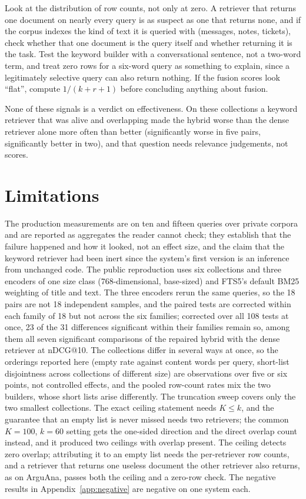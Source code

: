 \documentclass[11pt]{article}
\begin{document}
Look at the distribution of row counts, not only at zero. A retriever that returns one document on nearly every query is as suspect as one that returns none, and if the corpus indexes the kind of text it is queried with (messages, notes, tickets), check whether that one document is the query itself and whether returning it is the task. Test the keyword builder with a conversational sentence, not a two-word term, and treat zero rows for a six-word query as something to explain, since a legitimately selective query can also return nothing. If the fusion scores look ``flat'', compute $1/(k+r+1)$ before concluding anything about fusion.

None of these signals is a verdict on effectiveness. On these collections a keyword retriever that was alive and overlapping made the hybrid worse than the dense retriever alone more often than better (significantly worse in five pairs, significantly better in two), and that question needs relevance judgements, not scores.

\section{Limitations}
\label{sec:limits}

The production measurements are on ten and fifteen queries over private corpora and are reported as aggregates the reader cannot check; they establish that the failure happened and how it looked, not an effect size, and the claim that the keyword retriever had been inert since the system's first version is an inference from unchanged code. The public reproduction uses six collections and three encoders of one size class (768-dimensional, base-sized) and FTS5's default BM25 weighting of title and text. The three encoders rerun the same queries, so the 18 pairs are not 18 independent samples, and the paired tests are corrected within each family of 18 but not across the six families; corrected over all 108 tests at once, 23 of the 31 differences significant within their families remain so, among them all seven significant comparisons of the repaired hybrid with the dense retriever at nDCG@10. The collections differ in several ways at once, so the orderings reported here (empty rate against content words per query, short-list disjointness across collections of different size) are observations over five or six points, not controlled effects, and the pooled row-count rates mix the two builders, whose short lists arise differently. The truncation sweep covers only the two smallest collections. The exact ceiling statement needs $K \le k$, and the guarantee that an empty list is never missed needs two retrievers; the common $K = 100$, $k = 60$ setting gets the one-sided direction and the direct overlap count instead, and it produced two ceilings with overlap present. The ceiling detects zero overlap; attributing it to an empty list needs the per-retriever row counts, and a retriever that returns one useless document the other retriever also returns, as on ArguAna, passes both the ceiling and a zero-row check. The negative results in Appendix~\ref{app:negative} are negative on one system each.
\end{document}
